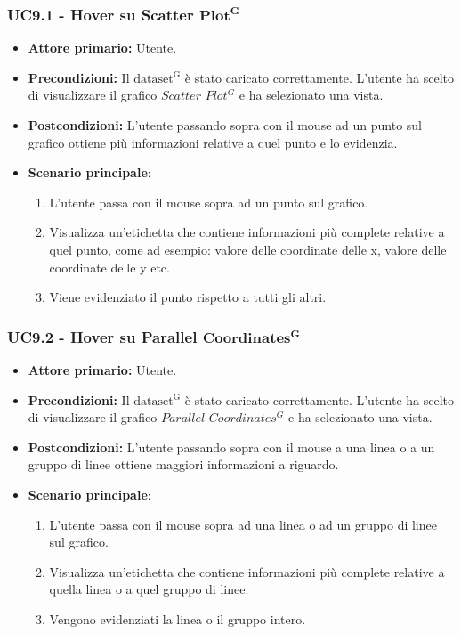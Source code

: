 \subsubsection{UC9.1 - Hover su Scatter ${\mathbf{Plot^{G}}}$}
\label{sec:UC9.1}
\begin{itemize}
    \item \textbf{Attore primario:} Utente.
    \item \textbf{Precondizioni:} Il ${\mathrm{dataset^{G}}}$ è stato caricato correttamente. L'utente ha scelto di visualizzare il grafico $Scatter$ $Plot^{G}$ e ha selezionato una vista.
    \item \textbf{Postcondizioni:} L'utente passando sopra con il mouse ad un punto sul grafico ottiene più informazioni relative a quel punto e lo evidenzia.
    \item \textbf{Scenario principale}: 
    \begin{enumerate}
		\item L'utente passa con il mouse sopra ad un punto sul grafico.
		\item Visualizza un'etichetta che contiene informazioni più complete relative a quel punto, come ad esempio: valore delle coordinate delle x, valore delle coordinate delle y etc. 
		\item Viene evidenziato il punto rispetto a tutti gli altri.
	\end{enumerate}
\end{itemize}

\subsubsection{UC9.2 - Hover su Parallel ${\mathbf{Coordinates^{G}}}$}
\label{sec:UC9.2}
\begin{itemize}
    \item \textbf{Attore primario:} Utente.
    \item \textbf{Precondizioni:} Il ${\mathrm{dataset^{G}}}$ è stato caricato correttamente. L'utente ha scelto di visualizzare il grafico $Parallel$ $Coordinates^{G}$ e ha selezionato una vista.
    \item \textbf{Postcondizioni:} L'utente passando sopra con il mouse a una linea o a un gruppo di linee ottiene maggiori informazioni a riguardo.
    \item \textbf{Scenario principale}:
    \begin{enumerate}
		\item L'utente passa con il mouse sopra ad una linea o ad un gruppo di linee sul grafico.
		\item Visualizza un'etichetta che contiene informazioni più complete relative a quella linea o a quel gruppo di linee.
		\item Vengono evidenziati la linea o il gruppo intero.
	\end{enumerate}
\end{itemize}

